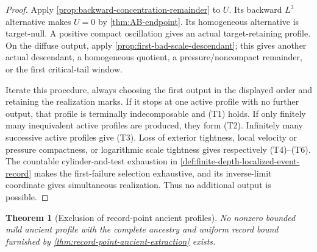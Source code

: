 \documentclass[11pt]{amsart}
\numberwithin{equation}{section}
\theoremstyle{plain}
\newtheorem{theorem}{Theorem}[section]
\theoremstyle{definition}
\theoremstyle{remark}
\begin{document}
\begin{proof}
Apply \cref{prop:backward-concentration-remainder} to \(U\).  Its backward
\(L^3\) alternative makes \(U=0\) by \cref{thm:AB-endpoint}.  Its homogeneous
alternative is target-null.  A positive compact oscillation gives an actual
target-retaining profile.  On the diffuse output, apply
\cref{prop:first-bad-scale-descendant}; this gives another actual descendant,
a homogeneous quotient, a pressure/noncompact remainder, or the first
critical-tail window.

Iterate this procedure, always choosing the first output in the displayed
order and retaining the realization marks.  If it stops at one active profile
with no further output, that profile is terminally indecomposable and
\textup{(T1)} holds.  If only finitely many inequivalent active profiles are
produced, they form \textup{(T2)}.  Infinitely many successive active profiles
give \textup{(T3)}.  Loss of exterior tightness, local velocity or pressure
compactness, or logarithmic scale tightness gives respectively
\textup{(T4)}--\textup{(T6)}.  The countable cylinder-and-test exhaustion in
\cref{def:finite-depth-localized-event-record} makes the first-failure
selection exhaustive, and its inverse-limit coordinate gives simultaneous
realization.  Thus no additional output is possible.
\end{proof}

\begin{theorem}[Exclusion of record-point ancient profiles]
\label{thm:record-point-profile-exclusion}
No nonzero bounded mild ancient profile with the complete ancestry and
uniform record bound furnished by
\cref{thm:record-point-ancient-extraction} exists.
\end{theorem}
\end{document}
